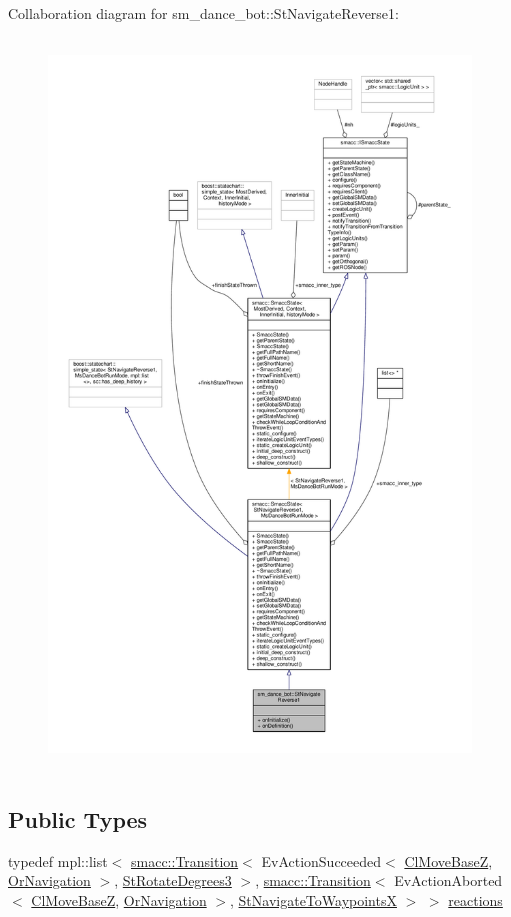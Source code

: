 Collaboration diagram for sm\+\_\+dance\+\_\+bot\+:\+:St\+Navigate\+Reverse1\+:\nopagebreak
\begin{figure}[H]
\begin{center}
\leavevmode
\includegraphics[height=550pt]{structsm__dance__bot_1_1StNavigateReverse1__coll__graph}
\end{center}
\end{figure}
\subsection*{Public Types}
\begin{DoxyCompactItemize}
\item 
typedef mpl\+::list$<$ \hyperlink{classsmacc_1_1Transition}{smacc\+::\+Transition}$<$ Ev\+Action\+Succeeded$<$ \hyperlink{classmove__base__z__client_1_1ClMoveBaseZ}{Cl\+Move\+BaseZ}, \hyperlink{classsm__dance__bot_1_1OrNavigation}{Or\+Navigation} $>$, \hyperlink{structsm__dance__bot_1_1StRotateDegrees3}{St\+Rotate\+Degrees3} $>$, \hyperlink{classsmacc_1_1Transition}{smacc\+::\+Transition}$<$ Ev\+Action\+Aborted$<$ \hyperlink{classmove__base__z__client_1_1ClMoveBaseZ}{Cl\+Move\+BaseZ}, \hyperlink{classsm__dance__bot_1_1OrNavigation}{Or\+Navigation} $>$, \hyperlink{structsm__dance__bot_1_1StNavigateToWaypointsX}{St\+Navigate\+To\+WaypointsX} $>$ $>$ \hyperlink{structsm__dance__bot_1_1StNavigateReverse1_a32d4baa6d9377c867ad1fd438aa80a85}{reactions}
\end{DoxyCompactItemize}
